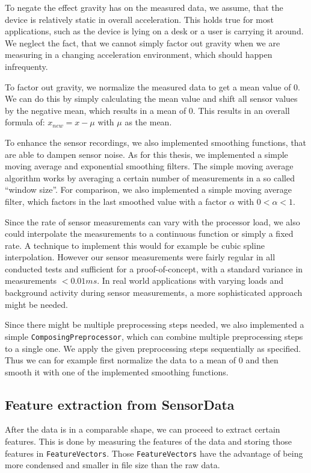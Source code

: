 To negate the effect gravity has on the measured data, we assume, that the device is relatively static in overall acceleration. This holds true for most applications, such as the device is lying on a desk or a user is carrying it around. We neglect the fact, that we cannot simply factor out gravity when we are measuring in a changing acceleration environment, which should happen infrequenty.

To factor out gravity, we normalize the measured data to get a mean value of 0. We can do this by simply calculating the mean value and shift all sensor values by the negative mean, which results in a mean of 0. This results in an overall formula of: $ x_{new} = x - \mu $ with $\mu$ as the mean.

To enhance the sensor recordings, we also implemented smoothing functions, that are able to dampen sensor noise. As for this thesis, we implemented a simple moving average and exponential smoothing filters. The simple moving average algorithm works by averaging a certain number of measurements in a so called ``window size''. For comparison, we also implemented a simple moving average filter, which factors in the last smoothed value with a factor $\alpha$ with $0 < \alpha < 1$.

Since the rate of sensor measurements can vary with the processor load, we also could interpolate the measurements to a continuous function or simply a fixed rate. A technique to implement this would for example be cubic spline interpolation. However our sensor measurements were fairly regular in all conducted tests and sufficient for a proof-of-concept, with a standard variance in measurements $< 0.01ms$. In real world applications with varying loads and background activity during sensor measurements, a more sophisticated approach might be needed.

Since there might be multiple preprocessing steps needed, we also implemented a simple \lstinline$ComposingPreprocessor$, which can combine multiple preprocessing steps to a single one. We apply the given preprocessing steps sequentially as specified. Thus we can for example first normalize the data to a mean of 0 and then smooth it with one of the implemented smoothing functions.

\subsection{Feature extraction from SensorData}\label{subsection:featureextraction}
After the data is in a comparable shape, we can proceed to extract certain features. This is done by measuring the features of the data and storing those features in \lstinline$FeatureVectors$. Those \lstinline$FeatureVectors$ have the advantage of being more condensed and smaller in file size than the raw data.

